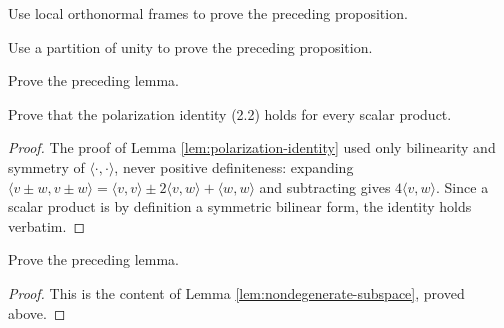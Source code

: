 \begin{exercise}
\label{exer:orthonormal-frames-proposition}
Use local orthonormal frames to prove the preceding proposition.
\end{exercise}

\begin{exercise}
\label{exer:partition-unity-proof}


Use a partition of unity to prove the preceding proposition.
\end{exercise}

\begin{exercise}
\label{exer:polarization-proof}


Prove the preceding lemma.
\end{exercise}

\begin{exercise}
\label{exer:polarization-scalar-product}


Prove that the polarization identity (2.2) holds for every scalar product.
\end{exercise}
\begin{proof}

The proof of Lemma \ref{lem:polarization-identity} used only bilinearity and symmetry of $\langle \cdot, \cdot \rangle$, never positive definiteness: expanding $\langle v \pm w, v \pm w \rangle = \langle v,v \rangle \pm 2\langle v,w \rangle + \langle w,w \rangle$ and subtracting gives $4\langle v,w \rangle$. Since a scalar product is by definition a symmetric bilinear form, the identity holds verbatim.
\end{proof}

\begin{exercise}\label{exer:preceding-lemma-nondegenerate}

Prove the preceding lemma.
\end{exercise}
\begin{proof}

This is the content of Lemma \ref{lem:nondegenerate-subspace}, proved above.
\end{proof}

